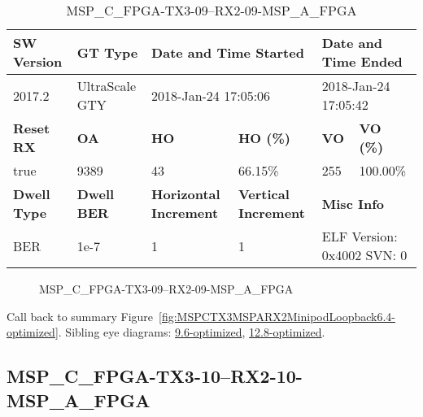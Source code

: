 \begin{table}[h]
\centering
\caption{MSP\_C\_FPGA-TX3-09--RX2-09-MSP\_A\_FPGA}
\label{tab:MSPCFPGATX309RX209MSPAFPGA6.4-optimized}
\begin{tabular}{@{}|l|l|l|l|l|l|@{}}
\toprule
\textbf{SW Version}                & \textbf{GT Type}   & \multicolumn{2}{l|}{\textbf{Date and Time Started}}            & \multicolumn{2}{l|}{\textbf{Date and Time Ended}}        \\ \midrule
2017.2                       & UltraScale GTY          & \multicolumn{2}{l|}{2018-Jan-24 17:05:06}                   & \multicolumn{2}{l|}{2018-Jan-24 17:05:42}               \\ \midrule
\textbf{Reset RX}                  & \textbf{OA} & \textbf{HO}   & \textbf{HO (\%)} & \textbf{VO} & \textbf{VO (\%)} \\ \midrule
true & 9389        & 43          & 66.15\%        & 255        & 100.00\%       \\ \midrule
\textbf{Dwell Type}                & \textbf{Dwell BER} & \textbf{Horizontal Increment} & \textbf{Vertical Increment}    & \multicolumn{2}{l|}{\textbf{Misc Info}}                  \\ \midrule
BER                            & 1e-7        & 1        & 1           & \multicolumn{2}{l|}{ELF Version: 0x4002 SVN: 0}                         \\ \bottomrule
\end{tabular}
\end{table}

\begin{figure}[h]
\caption{MSP\_C\_FPGA-TX3-09--RX2-09-MSP\_A\_FPGA} \label{fig:MSPCFPGATX309RX209MSPAFPGA6.4-optimized}
\end{figure}

Call back to summary Figure~\ref{fig:MSPCTX3MSPARX2MinipodLoopback6.4-optimized}.
Sibling eye diagrams: \hyperref[sec:MSPCFPGATX309RX209MSPAFPGA9.6-optimized]{9.6-optimized}, \hyperref[sec:MSPCFPGATX309RX209MSPAFPGA12.8-optimized]{12.8-optimized}.

\clearpage
\newpage


\subsection{MSP\_C\_FPGA-TX3-10--RX2-10-MSP\_A\_FPGA}\label{sec:MSPCFPGATX310RX210MSPAFPGA6.4-optimized}

